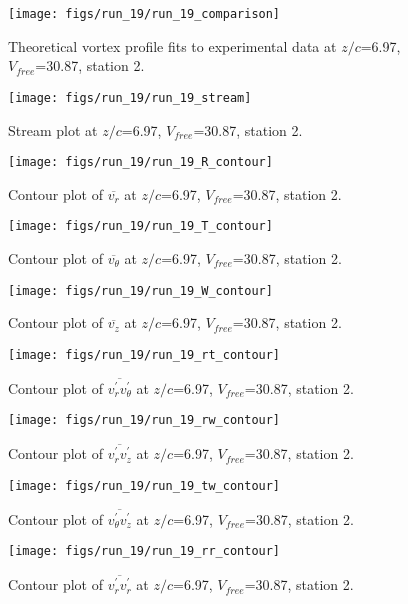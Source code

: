\begin{figure}[H]
\centering
\texttt{[image: figs/run\_19/run\_19\_comparison]}
\caption{Theoretical vortex profile fits to experimental data at $z/c$=6.97, $V_{free}$=30.87, station 2.}
\end{figure}


\begin{figure}[H]
\centering
\texttt{[image: figs/run\_19/run\_19\_stream]}
\caption{Stream plot at $z/c$=6.97, $V_{free}$=30.87, station 2.}
\end{figure}


\begin{figure}[H]
\centering
\texttt{[image: figs/run\_19/run\_19\_R\_contour]}
\caption{Contour plot of $\overline{v_{r}}$ at $z/c$=6.97, $V_{free}$=30.87, station 2.}
\end{figure}


\begin{figure}[H]
\centering
\texttt{[image: figs/run\_19/run\_19\_T\_contour]}
\caption{Contour plot of $\overline{v_{\theta}}$ at $z/c$=6.97, $V_{free}$=30.87, station 2.}
\end{figure}


\begin{figure}[H]
\centering
\texttt{[image: figs/run\_19/run\_19\_W\_contour]}
\caption{Contour plot of $\overline{v_{z}}$ at $z/c$=6.97, $V_{free}$=30.87, station 2.}
\end{figure}


\begin{figure}[H]
\centering
\texttt{[image: figs/run\_19/run\_19\_rt\_contour]}
\caption{Contour plot of $\overline{v_{r}^{\prime} v_{\theta}^{\prime}}$ at $z/c$=6.97, $V_{free}$=30.87, station 2.}
\end{figure}


\begin{figure}[H]
\centering
\texttt{[image: figs/run\_19/run\_19\_rw\_contour]}
\caption{Contour plot of $\overline{v_{r}^{\prime} v_{z}^{\prime}}$ at $z/c$=6.97, $V_{free}$=30.87, station 2.}
\end{figure}


\begin{figure}[H]
\centering
\texttt{[image: figs/run\_19/run\_19\_tw\_contour]}
\caption{Contour plot of $\overline{v_{\theta}^{\prime} v_{z}^{\prime}}$ at $z/c$=6.97, $V_{free}$=30.87, station 2.}
\end{figure}


\begin{figure}[H]
\centering
\texttt{[image: figs/run\_19/run\_19\_rr\_contour]}
\caption{Contour plot of $\overline{v_{r}^{\prime} v_{r}^{\prime}}$ at $z/c$=6.97, $V_{free}$=30.87, station 2.}
\end{figure}


